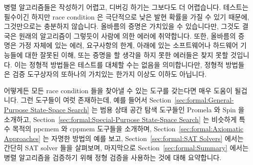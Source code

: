 
%


병렬 알고리즘들은 작성하기 어렵고, 디버깅 하기는 그보다도 더 어렵습니다.
테스트는 필수이긴 하지만 race condition 은 극단적으로 낮은 발현 확률을 가질 수
있기 때문에, 그것만으로는 충분하지 않습니다.
올바름의 증명은 가치있을 수 있습니다만, 그것도 결국은 원래의 알고리즘이
그렇듯이 사람에 의한 에러에 취약합니다.
또한, 올바름의 증명은 가정 자체에 있는 에러, 요구사항의 한계, 아래에 있는
소프트웨어나 하드웨어 기능들에 대한 잘못된 이해, 또는 증명을 할 생각을 하지
못한 에러들은 찾지 못할 것입니다.
이는 정형적 방법들은 테스트를 대체할 수는 없음을 의미합니다만, 정형적 방법들은
검증 도구상자의 또하나의 가치있는 한가지 이상도 이하도 아닙니다.
\iffalse

Parallel algorithms can be hard to write, and even harder to debug.
Testing, though essential, is insufficient, as fatal race conditions
can have extremely low probabilities of occurrence.
Proofs of correctness can be valuable, but in the end are just as
prone to human error as is the original algorithm.
In addition, a proof of correctness cannot be expected to find errors
in your assumptions, shortcomings in the requirements,
misunderstandings of the underlying software or hardware primitives,
or errors that you did not think to construct a proof for.
This means that formal methods can never replace testing, however,
formal methods are nevertheless a valuable addition to your validation toolbox.
\fi

어떻게든 모든 race condition 들을 찾아낼 수 있는 도구를 갖는다면 매우 도움이
될겁니다.
그런 도구들이 여럿 존재하는데, 예를 들어서
Section~\ref{sec:formal:General-Purpose State-Space Search}
는 범용 상태 공간 탐색 도구들인 Promela 와 Spin 을 소개하고,
Section~\ref{sec:formal:Special-Purpose State-Space Search}
는 비슷하게 특수 목적의 ppcmem 와 cppmem 도구들을 소개하며,
Section~\ref{sec:formal:Axiomatic Approaches}
는 자명한 방법의 예를 보고,
Section~\ref{sec:formal:SAT Solvers}
에서는 간단히 SAT solver 들을 살펴보며, 마지막으로
Section~\ref{sec:formal:Summary}
에서는 병렬 알고리즘을 검증하기 위해 정형 검증을 사용하는 것에 대해 요약합니다.
\iffalse

